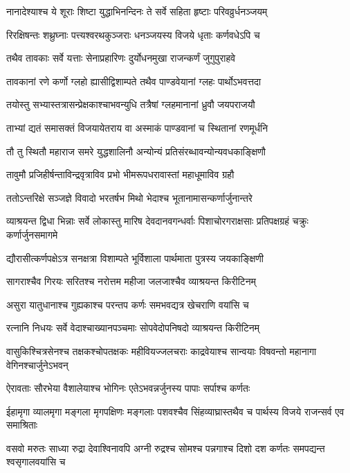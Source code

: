 \twolineshloka
{नानादेश्याश्च ये शूराः शिष्टा युद्धाभिनन्दिनः}
{ते सर्वे सहिता हृष्टाः परिवव्रुर्धनञ्जयम्}


\twolineshloka
{रिरक्षिषन्तः शथ्रुघ्नाः पत्त्यश्वरथकुञ्जराः}
{धनञ्जयस्य विजये धृताः कर्णवधेऽपि च}


\twolineshloka
{तथैव तावकाः सर्वे यत्ताः सेनाप्रहारिणः}
{दुर्योधनमुखा राजन्कर्णं जुगुपुराहवे}


\twolineshloka
{तावकानां रणे कर्णो ग्लहो ह्यासीद्विशाम्पते}
{तथैव पाण्डवेयानां ग्लहः पार्थोऽभवत्तदा}


\twolineshloka
{तयोस्तु सभ्यास्तत्रासन्प्रेक्षकाश्चाभवन्युधि}
{तत्रैषां ग्लहमानानां ध्रुवौ जयपराजयौ}


\twolineshloka
{ताभ्यां द्यतं समासक्तं विजयायेतराय वा}
{अस्माकं पाण्डवानां च स्थितानां रणमूर्धनि}


\twolineshloka
{तौ तु स्थितौ महाराज समरे युद्धशालिनौ}
{अन्योन्यं प्रतिसंरब्धावन्योन्यवधकाङ्क्षिणौ}


\twolineshloka
{तावुमौ प्रजिहीर्षन्ताविन्द्रवृत्राविव प्रभो}
{भीमरूपधरावास्तां महाधूमाविव ग्रहौ}


\twolineshloka
{ततोऽन्तरिक्षे सञ्जज्ञे विवादो भरतर्षभ}
{मिथो भेदाश्च भूतानामासन्कर्णार्जुनान्तरे}


\threelineshloka
{व्याश्रयन्त द्विधा भिन्नाः सर्वे लोकास्तु मारिष}
{देवदानवगन्धर्वाः पिशाचोरगराक्षसाः}
{प्रतिपक्षग्रहं चक्रुः कर्णार्जुनसमागमे}


\twolineshloka
{द्यौरासीत्कर्णपक्षेऽत्र सनक्षत्रा विशाम्पते}
{भूर्विशाला पार्थमाता पुत्रस्य जयकाङ्क्षिणी}


\twolineshloka
{सागराश्चैव गिरयः सरितश्च नरोत्तम}
{महीजा जलजाश्चैव व्याश्रयन्त किरीटिनम्}


\twolineshloka
{असुरा यातुधानाश्च गुह्यकाश्च परन्तप}
{कर्णः समभवद्यत्र खेचराणि वयांसि च}


\twolineshloka
{रत्नानि निधयः सर्वे वेदाश्चाख्यानपञ्चमाः}
{सोपवेदोपनिषदो व्याश्रयन्त किरीटिनम्}


\threelineshloka
{वासुकिश्चित्रसेनश्च तक्षकश्चोपतक्षकः}
{महीवियज्जलचराः काद्रवेयाश्च सान्वयाः}
{विषवन्तो महानागा वेगिनश्चार्जुनेऽभवन्}


\twolineshloka
{ऐरावताः सौरभेया वैशालेयाश्च भोगिनः}
{एतेऽभवन्नर्जुनस्य पापाः सर्पाश्च कर्णतः}


\threelineshloka
{ईहामृगा व्यालमृगा मङ्गला मृगपक्षिणः}
{मङ्गलाः पशवश्चैव सिंहव्याघ्रास्तथैव च}
{पार्थस्य विजये राजन्सर्व एव समाश्रिताः}


\threelineshloka
{वसवो मरुतः साध्या रुद्रा देवाश्विनावपि}
{अग्नी रुद्रश्च सोमश्च पन्नगाश्च दिशो दश}
{कर्णतः समपद्यन्त श्वसृगालवयांसि च}


